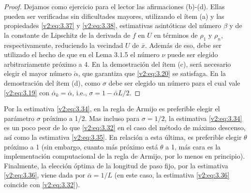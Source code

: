\begin{proof}
    Dejamos como ejercicio para el lector las afirmaciones (b)-(d). Ellas pueden ser verificadas sin dificultades mayores, utilizando el ítem (a) y las propiedades \eqref{v2:eq:3.37} y \eqref{v2:eq:3.38}, estimativas asintóticas del número $\beta$ y de la constante de Lipschitz de la derivada de $f$ en $U$ en términos de $\rho_1$ y $\rho_n$, respectivamente, reduciendo la vecindad $U$ de $\bar{x}$. Además de eso, debe ser utilizado el hecho de que en el Lema 3.1.5 el número $\nu$ puede ser elegido arbitrariamente próximo a 4. En la demostración del ítem (c), será necesario elegir el mayor número $\check{\alpha}$, que garantiza que \eqref{v2:eq:3.20} se satisfaga. En la demostración del ítem (d), como $\sigma$ debe ser elegido un número para el cual vale \eqref{v2:eq:3.19} con $\bar{\alpha}_k = \bar{\alpha}$, i.e., $\sigma = 1 - \bar{\alpha} L/2$.
\end{proof}


Por la estimativa \eqref{v2:eq:3.34}, en la regla de Armijo es preferible elegir el parámetro $\sigma$ próximo a 1/2. Mas incluso para $\sigma = 1/2$, la estimativa \eqref{v2:eq:3.34} es un poco peor de lo que \eqref{v2:eq:3.32} en el caso del método de máximo descenso, así como la estimativa \eqref{v2:eq:3.35}. En relación a esta última, es preferible elegir $\theta$ próximo a 1 (sin embargo, cuanto más próximo está $\theta$ a 1, más cara es la implementación computacional de la regla de Armijo, por lo menos en principio). Finalmente, la elección óptima de la longitud de paso fijo, por la estimativa \eqref{v2:eq:3.36}, viene dada por $\bar{\alpha} = 1/L$ (en este caso, la estimativa \eqref{v2:eq:3.36} coincide con \eqref{v2:eq:3.32}).

